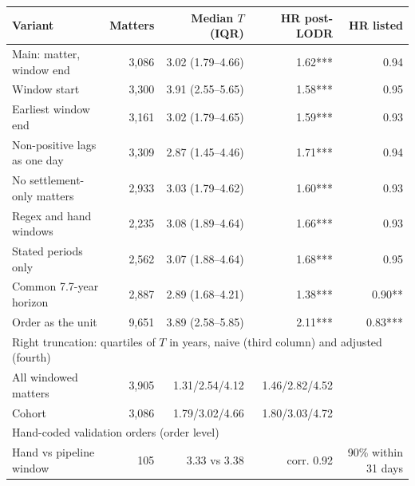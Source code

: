 \begin{tabular*}{\textwidth}[]{l@{\extracolsep\fill}rrrr}
\toprule
Variant & Matters & Median $T$ (IQR) & HR post-LODR & HR listed\\
\midrule
Main: matter, window end & 3,086 & 3.02 (1.79--4.66) & 1.62*** & 0.94\\
Window start & 3,300 & 3.91 (2.55--5.65) & 1.58*** & 0.95\\
Earliest window end & 3,161 & 3.02 (1.79--4.65) & 1.59*** & 0.93\\
Non-positive lags as one day & 3,309 & 2.87 (1.45--4.46) & 1.71*** & 0.94\\
No settlement-only matters & 2,933 & 3.03 (1.79--4.62) & 1.60*** & 0.93\\
Regex and hand windows & 2,235 & 3.08 (1.89--4.64) & 1.66*** & 0.93\\
Stated periods only & 2,562 & 3.07 (1.88--4.64) & 1.68*** & 0.95\\
Common 7.7-year horizon & 2,887 & 2.89 (1.68--4.21) & 1.38*** & 0.90**\\
Order as the unit & 9,651 & 3.89 (2.58--5.85) & 2.11*** & 0.83***\\
\midrule
\multicolumn{5}{l}{Right truncation: quartiles of $T$ in years, naive (third column) and adjusted (fourth)}\\
All windowed matters & 3,905 & 1.31/2.54/4.12 & 1.46/2.82/4.52 & \\
Cohort & 3,086 & 1.79/3.02/4.66 & 1.80/3.03/4.72 & \\
\midrule
\multicolumn{5}{l}{Hand-coded validation orders (order level)}\\
Hand vs pipeline window & 105 & 3.33 vs 3.38 & corr. 0.92 & 90\% within 31 days\\
\bottomrule
\end{tabular*}
